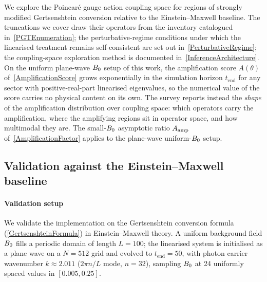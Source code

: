 We explore the Poincar\'{e} gauge action coupling space for regions
of strongly modified Gertsenshtein conversion relative to the
Einstein--Maxwell baseline. The truncations we cover draw their
operators from the inventory catalogued in~\cref{PGTEnumeration};
the perturbative-regime conditions under which the linearised
treatment remains self-consistent are set out
in~\cref{PerturbativeRegime}; the coupling-space exploration method
is documented in~\cref{InferenceArchitecture}. On the uniform
plane-wave $B_0$ setup of this work, the amplification score
$A(\theta)$ of~\cref{AmplificationScore} grows exponentially in the
simulation horizon $t_\mathrm{end}$ for any sector with
positive-real-part linearised eigenvalues, so the numerical value
of the score carries no physical content on its own. The survey reports instead the \emph{shape} of the
amplification distribution over coupling space: which operators
carry the amplification, where the amplifying regions sit in
operator space, and how multimodal they are. The small-$B_0$
asymptotic ratio $A_\mathrm{amp}$ of~\cref{AmplificationFactor} applies to
the plane-wave uniform-$B_0$ setup.

\subsection{Validation against the Einstein--Maxwell baseline}%
\label{ValidationResult}

\paragraph*{Validation setup}
We validate the implementation on the Gertsenshtein conversion
formula (\cref{GertsenshteinFormula}) in Einstein--Maxwell theory.
A uniform background field $B_0$ fills a periodic domain of length
$L=100$; the linearised system is initialised as a plane wave on a
$N=512$ grid and evolved to $t_\text{end}=50$, with photon carrier
wavenumber $k\approx2.011$ ($2\pi n/L$ mode, $n=32$),
sampling $B_0$ at 24 uniformly spaced values in $[0.005,0.25]$.

